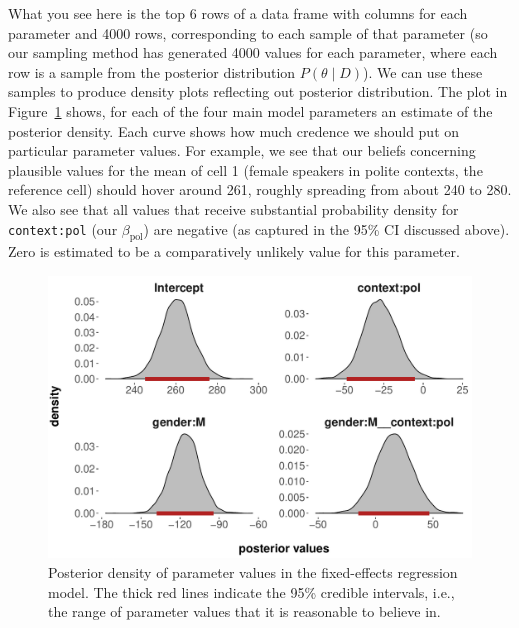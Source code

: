 \documentclass[nobib]{tufte-handout}
\begin{document}
What you see here is the top 6 rows of a data frame with columns for each parameter and 4000 rows, corresponding to each sample of that parameter (so our sampling method has generated 4000 values for each parameter, where each row is a sample from the posterior distribution $P(\theta \mid D)$).
%
%
We can use these samples to produce density plots reflecting out posterior distribution. The plot in Figure~\ref{fig:Posteriors_FE}
shows, for each of the four main model parameters an estimate of the posterior density. Each
curve shows how much credence we should put on particular parameter values. For example, we see
that our beliefs concerning plausible values for the mean of cell 1 (female speakers in polite
contexts, the reference cell) should hover around 261, roughly spreading from about 240 to 280. We also see that all values that receive substantial probability density for \texttt{context:pol} (our $\beta_{\text{pol}}$) are negative (as captured in the 95\% CI discussed above). Zero is estimated to be a comparatively unlikely value for this parameter.

\begin{figure}
  \centering
  \includegraphics[width=\textwidth]{pics/posterior_density_FE.pdf}
  \caption[Posterior over coefficients in fixed-effects model]{Posterior density of parameter
    values in the fixed-effects regression model. The thick red lines indicate the 95\%
    credible intervals, i.e., the range of parameter values that it is reasonable to believe
    in.}
  \label{fig:Posteriors_FE}
\end{figure}
\end{document}
